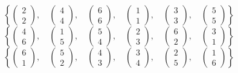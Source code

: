 \[\left\{\begin{pmatrix}
2 \\ 2 
\end{pmatrix},\quad
\begin{pmatrix}
4 \\ 4 
\end{pmatrix},\quad
\begin{pmatrix}
6 \\ 6 
\end{pmatrix},\quad
\begin{pmatrix}
1 \\ 1 
\end{pmatrix},\quad
\begin{pmatrix}
3 \\ 3 
\end{pmatrix},\quad
\begin{pmatrix}
5 \\ 5 
\end{pmatrix}
\right\}
\]
\[\left\{\begin{pmatrix}
4 \\ 6 
\end{pmatrix},\quad
\begin{pmatrix}
1 \\ 5 
\end{pmatrix},\quad
\begin{pmatrix}
5 \\ 4 
\end{pmatrix},\quad
\begin{pmatrix}
2 \\ 3 
\end{pmatrix},\quad
\begin{pmatrix}
6 \\ 2 
\end{pmatrix},\quad
\begin{pmatrix}
3 \\ 1 
\end{pmatrix}
\right\}
\]
\[\left\{\begin{pmatrix}
6 \\ 1 
\end{pmatrix},\quad
\begin{pmatrix}
5 \\ 2 
\end{pmatrix},\quad
\begin{pmatrix}
4 \\ 3 
\end{pmatrix},\quad
\begin{pmatrix}
3 \\ 4 
\end{pmatrix},\quad
\begin{pmatrix}
2 \\ 5 
\end{pmatrix},\quad
\begin{pmatrix}
1 \\ 6 
\end{pmatrix}
\right\}
\]
